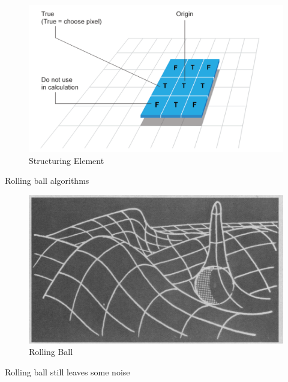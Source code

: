 \begin{figure}[htb]
	\begin{center}
		\includegraphics[width=0.5\linewidth]{bilder/structuring-element.png}
		\caption{Structuring Element}\label{fig:structuring-element}
	\end{center}
\end{figure}

Rolling ball algorithms
\begin{figure}[htb]
	\begin{center}
		\includegraphics[width=0.5\linewidth]{bilder/rolling-ball.png}
		\caption{Rolling Ball}\label{fig:rolling-ball}
	\end{center}
\end{figure}

Rolling ball still leaves some noise


